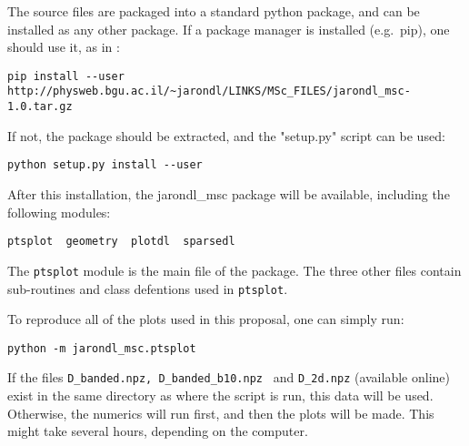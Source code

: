 The source files are packaged into a standard python package,
and can be installed as any other package. If a package manager is installed (e.g.\ pip),
one should use it, as in :
\begin{verbatim}
pip install --user http://physweb.bgu.ac.il/~jarondl/LINKS/MSc_FILES/jarondl_msc-1.0.tar.gz
\end{verbatim}
If not, the package should be extracted, and the "setup.py" script can be used:
\begin{verbatim}
python setup.py install --user
\end{verbatim}
After this installation, the jarondl\_msc package will be available,
including the following modules:
\begin{verbatim}
ptsplot  geometry  plotdl  sparsedl
\end{verbatim}

The \texttt{ptsplot} module is the main file of the package. The three other files contain
sub-routines and class defentions used in \texttt{ptsplot}.


To reproduce all of the plots used in this proposal, one can simply run:
\begin{verbatim}
python -m jarondl_msc.ptsplot
\end{verbatim}
If the files \texttt{D\_banded.npz, D\_banded\_b10.npz } and \texttt{D\_2d.npz} (available online)
exist in the same directory as where the script is run,
this data will be used. Otherwise, the numerics will run first, and then the plots will be made. This might take several hours,
depending on the computer.



